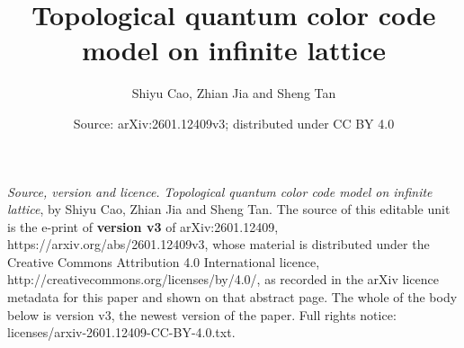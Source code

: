 \documentclass[10pt,a4paper]{amsart}
\theoremstyle{definition}
\theoremstyle{remark}
\theoremstyle{remark}
\begin{document}
\title{Topological quantum color code model on infinite lattice}
\author{Shiyu Cao, Zhian Jia and Sheng Tan}
\date{Source: arXiv:2601.12409v3; distributed under CC BY 4.0}
\maketitle
\noindent\emph{Source, version and licence.} \emph{Topological quantum color code model on infinite lattice}, by Shiyu Cao, Zhian Jia and Sheng Tan. The source of this editable unit is the e-print of \textbf{version v3} of arXiv:2601.12409, https://arxiv.org/abs/2601.12409v3, whose material is distributed under the Creative Commons Attribution 4.0 International licence, http://creativecommons.org/licenses/by/4.0/, as recorded in the arXiv licence metadata for this paper and shown on that abstract page. The whole of the body below is version v3, the newest version of the paper. Full rights notice: licenses/arxiv-2601.12409-CC-BY-4.0.txt.\par\smallskip
\end{document}
